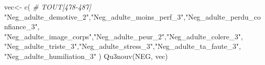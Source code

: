 \documentclass[
]{article}
\newenvironment{Shaded}{\begin{snugshade}}{\end{snugshade}}
\newcommand{\CommentTok}[1]{\textcolor[rgb]{0.56,0.35,0.01}{\textit{#1}}}
\newcommand{\FunctionTok}[1]{\textcolor[rgb]{0.00,0.00,0.00}{#1}}
\newcommand{\NormalTok}[1]{#1}
\newcommand{\OtherTok}[1]{\textcolor[rgb]{0.56,0.35,0.01}{#1}}
\newcommand{\StringTok}[1]{\textcolor[rgb]{0.31,0.60,0.02}{#1}}
\begin{document}
\begin{Shaded}
\begin{Highlighting}[]
\NormalTok{vec}\OtherTok{\textless{}{-}} \FunctionTok{c}\NormalTok{(  }\CommentTok{\#  TOUT[478{-}487]}
  \StringTok{"Neg\_adulte\_demotive\_2"}\NormalTok{,}\StringTok{"Neg\_adulte\_moins\_perf\_3"}\NormalTok{,}\StringTok{"Neg\_adulte\_perdu\_confiance\_3"}\NormalTok{,}
  \StringTok{"Neg\_adulte\_image\_corps"}\NormalTok{,}\StringTok{"Neg\_adulte\_peur\_2"}\NormalTok{,}\StringTok{"Neg\_adulte\_colere\_3"}\NormalTok{,}
  \StringTok{"Neg\_adulte\_triste\_3"}\NormalTok{,}\StringTok{"Neg\_adulte\_stress\_3"}\NormalTok{,}\StringTok{"Neg\_adulte\_ta\_faute\_3"}\NormalTok{,}
  \StringTok{"Neg\_adulte\_humiliation\_3"}
\NormalTok{  )}
\FunctionTok{Qu3nouv}\NormalTok{(NEG, vec)}
\end{Highlighting}
\end{Shaded}
\end{document}
